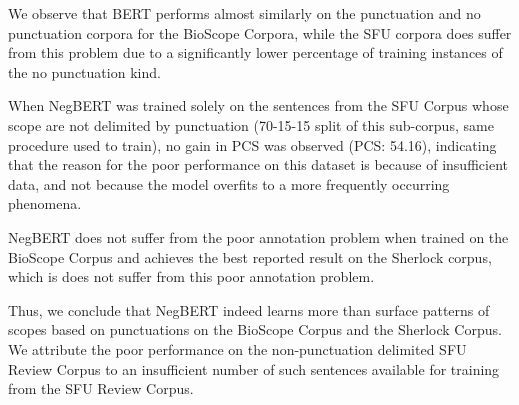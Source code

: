 \documentclass[10pt, a4paper]{article}
\begin{document}
\par We observe that BERT performs almost similarly on the punctuation and no punctuation corpora for the BioScope Corpora, while the SFU corpora does suffer from this problem due to a significantly lower percentage of training instances of the no punctuation kind.
\par When NegBERT was trained solely on the sentences from the SFU Corpus whose scope are not delimited by punctuation (70-15-15 split of this sub-corpus, same procedure used to train), no gain in PCS was observed (PCS: 54.16), indicating that the reason for the poor performance on this dataset is because of insufficient data, and not because the model overfits to a more frequently occurring phenomena. 
\par NegBERT does not suffer from the poor annotation problem when trained on the BioScope Corpus and achieves the best reported result on the Sherlock corpus, which is does not suffer from this poor annotation problem.
\par Thus, we conclude that NegBERT indeed learns more than surface patterns of scopes based on punctuations on the BioScope Corpus and the Sherlock Corpus. We attribute the poor performance on the non-punctuation delimited SFU Review Corpus to an insufficient number of such sentences available for training from the SFU Review Corpus.
\end{document}
